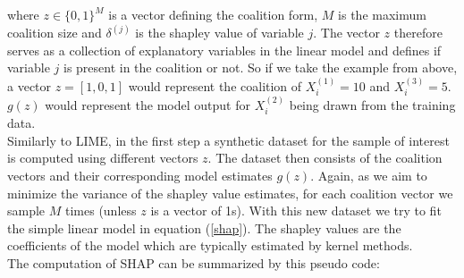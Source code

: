 \documentclass[12pt,titlepage]{article}
\begin{document}
\noindent
where $z\in \{0,1\}^{M}$ is a vector defining the coalition form, $M$ is the maximum coalition size and $\delta^{(j)}$ is the shapley value of variable $j$. The vector $z$ therefore serves as a collection of explanatory variables in the linear model and defines if variable $j$ is present in the coalition or not. So if we take the example from above, a vector $z=[1,0,1]$ would represent the coalition of $X^{(1)}_{i}=10$ and $X^{(3)}_{i}=5$. $g(z)$ would represent the model output for $X^{(2)}_{i}$ being drawn from the training data. \\
Similarly to LIME, in the first step a synthetic dataset for the sample of interest is computed using different vectors $z$. The dataset then consists of the coalition vectors and their corresponding model estimates $g(z)$. Again, as we aim to minimize the variance of the shapley value estimates, for each coalition vector we sample $M$ times (unless $z$ is a vector of 1s). With this new dataset we try to fit the simple linear model in equation (\ref{shap}). The shapley values are the coefficients of the model which are typically estimated by kernel methods. \\
The computation of SHAP can be summarized by this pseudo code: \\
\end{document}

